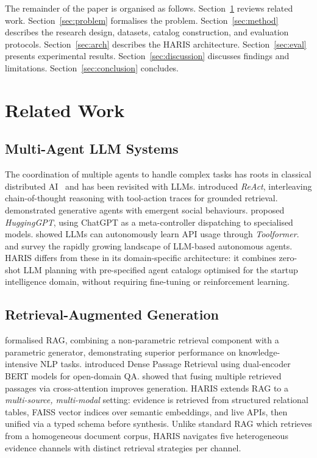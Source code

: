\documentclass[preprint,12pt]{elsarticle}
\begin{document}
The remainder of the paper is organised as follows. Section~\ref{sec:related}
reviews related work. Section~\ref{sec:problem} formalises the problem.
Section~\ref{sec:method} describes the research design, datasets, catalog
construction, and evaluation protocols. Section~\ref{sec:arch} describes the
HARIS architecture. Section~\ref{sec:eval} presents experimental results.
Section~\ref{sec:discussion} discusses findings and limitations.
Section~\ref{sec:conclusion} concludes.

\section{Related Work}
\label{sec:related}

\subsection{Multi-Agent LLM Systems}

The coordination of multiple agents to handle complex tasks has roots in
classical distributed AI~\cite{minsky1986} and has been revisited with LLMs.
\citet{yao2023react} introduced \emph{ReAct}, interleaving chain-of-thought
reasoning with tool-action traces for grounded retrieval. \citet{park2023generative}
demonstrated generative agents with emergent social behaviours.
\citet{shen2023hugging} proposed \emph{HuggingGPT}, using ChatGPT as a
meta-controller dispatching to specialised models. \citet{schick2023toolformer}
showed LLMs can autonomously learn API usage through \emph{Toolformer}.
\citet{wang2024survey} and \citet{xi2023rise} survey the rapidly growing
landscape of LLM-based autonomous agents. HARIS differs from these in its
domain-specific architecture: it combines zero-shot LLM planning with
pre-specified agent catalogs optimised for the startup intelligence domain,
without requiring fine-tuning or reinforcement learning.

\subsection{Retrieval-Augmented Generation}

\citet{lewis2020rag} formalised RAG, combining a non-parametric retrieval
component with a parametric generator, demonstrating superior performance on
knowledge-intensive NLP tasks. \citet{karpukhin2020dpr} introduced Dense Passage
Retrieval using dual-encoder BERT models for open-domain QA.
\citet{izacard2021leveraging} showed that fusing multiple retrieved passages via
cross-attention improves generation. HARIS extends RAG to a \emph{multi-source,
multi-modal} setting: evidence is retrieved from structured relational tables,
FAISS vector indices over semantic embeddings, and live APIs, then unified via a
typed schema before synthesis. Unlike standard RAG which retrieves from a
homogeneous document corpus, HARIS navigates five heterogeneous evidence channels
with distinct retrieval strategies per channel.
\end{document}
